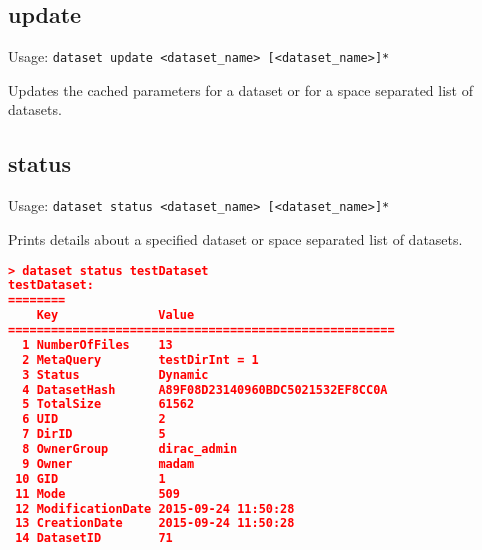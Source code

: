 \subsection{update}

Usage: \texttt{dataset update <dataset\_name> [<dataset\_name>]*}

Updates the cached parameters for a dataset or for a space
separated list of datasets.

\pagebreak

\subsection{status}

Usage: \texttt{dataset status <dataset\_name> [<dataset\_name>]*}

Prints details about a specified dataset or space separated list of
datasets.

\begin{lstlisting}[language=json]
> dataset status testDataset
testDataset:
========
    Key              Value
======================================================
  1 NumberOfFiles    13
  2 MetaQuery        testDirInt = 1
  3 Status           Dynamic
  4 DatasetHash      A89F08D23140960BDC5021532EF8CC0A
  5 TotalSize        61562
  6 UID              2
  7 DirID            5
  8 OwnerGroup       dirac_admin
  9 Owner            madam
 10 GID              1
 11 Mode             509
 12 ModificationDate 2015-09-24 11:50:28
 13 CreationDate     2015-09-24 11:50:28
 14 DatasetID        71
\end{lstlisting}

